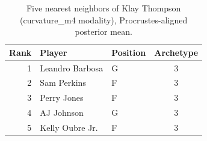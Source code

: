 \begin{table}[htbp]
  \centering\small
  \begin{tabular}{rllc}
    \toprule
    Rank & Player & Position & Archetype \\
    \midrule
    1 & Leandro Barbosa & G & 3 \\
    2 & Sam Perkins & F & 3 \\
    3 & Perry Jones & F & 3 \\
    4 & AJ Johnson & G & 3 \\
    5 & Kelly Oubre Jr. & F & 3 \\
    \bottomrule
  \end{tabular}
  \caption{Five nearest neighbors of Klay Thompson (curvature_m4 modality), Procrustes-aligned posterior mean.}
  \label{tab:Klay_Thompson_neighbors_curvature_m4}
\end{table}

